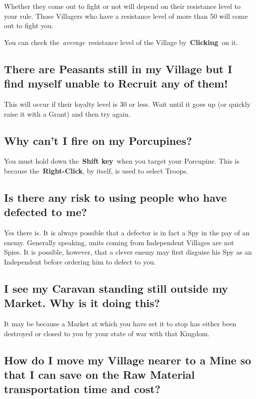 Whether they come out to fight or not will depend on their resistance level to your rule. Those Villagers who have a resistance level of more than 50 will come out to fight you.

You can check the \textit{average} resistance level of the Village by \textbf{Clicking} on it.

\subsection{There are Peasants still in my Village but I find myself unable to Recruit any of them!}

This will occur if their loyalty level is 30 or less. Wait until it goes up (or quickly raise it with a Grant) and then try again.

\subsection{Why can’t I fire on my Porcupines?}

You must hold down the \textbf{Shift key} when you target your Porcupine. This is because the \textbf{Right-Click}, by itself, is used to select Troops.

\subsection{Is there any risk to using people who have defected to me?}

Yes there is. It is always possible that a defector is in fact a Spy in the pay of an enemy. Generally speaking, units coming from Independent Villages are not Spies. It is possible, however, that a clever enemy may first disguise his Spy as an Independent before ordering him to defect to you.

\subsection{I see my Caravan standing still outside my Market. Why is it doing this?}

It may be because a Market at which you have set it to stop has either been destroyed or closed to you by your state of war with that Kingdom.

\subsection{How do I move my Village nearer to a Mine so that I can save on the Raw Material transportation time and cost?}

